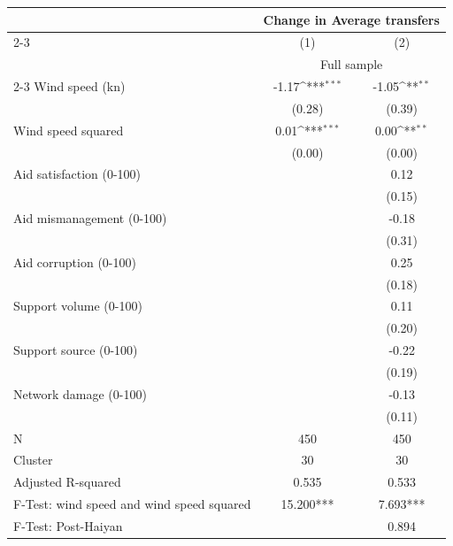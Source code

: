 {
\def\sym#1{\ifmmode^{#1}\else\(^{#1}\)\fi}
\begin{tabular}{l*{2}{c}}
\toprule
                    &\multicolumn{2}{c}{Change in Average transfers}\\\cmidrule(lr){2-3}
                    &\multicolumn{1}{c}{(1)}         &\multicolumn{1}{c}{(2)}         \\
& \multicolumn{2}{c}{Full sample} \\
\cmidrule(lr){2-3}
\midrule
Wind speed (kn)     &       -1.17\sym{***}&       -1.05\sym{**} \\
                    &      (0.28)         &      (0.39)         \\
Wind speed squared  &        0.01\sym{***}&        0.00\sym{**} \\
                    &      (0.00)         &      (0.00)         \\
Aid satisfaction (0-100)&                     &        0.12         \\
                    &                     &      (0.15)         \\
Aid mismanagement (0-100)&                     &       -0.18         \\
                    &                     &      (0.31)         \\
Aid corruption (0-100)&                     &        0.25         \\
                    &                     &      (0.18)         \\
Support volume (0-100)&                     &        0.11         \\
                    &                     &      (0.20)         \\
Support source (0-100)&                     &       -0.22         \\
                    &                     &      (0.19)         \\
Network damage (0-100)&                     &       -0.13         \\
                    &                     &      (0.11)         \\
\midrule
N                   &         450         &         450         \\
Cluster             &          30         &          30         \\
Adjusted R-squared  &       0.535         &       0.533         \\
F-Test: wind speed and wind speed squared&   15.200***         &    7.693***         \\
F-Test: Post-Haiyan &                     &       0.894         \\
\bottomrule
\end{tabular}
}
